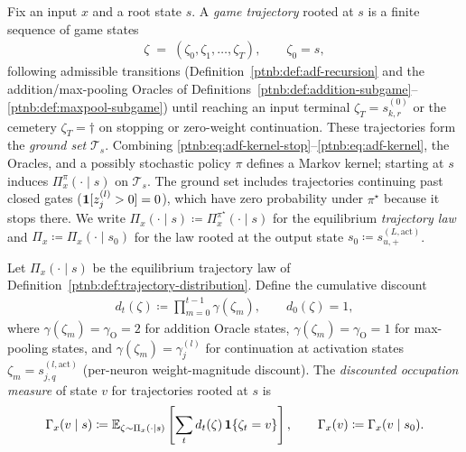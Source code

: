 \begin{definition}\label{ptnb:def:trajectory-distribution}
Fix an input $x$ and a root state $s$. A \emph{game trajectory} rooted at $s$ is a finite sequence
of game states
\begin{align}
    \zeta \;=\; (\zeta_0, \zeta_1, \dots, \zeta_T), \qquad \zeta_0 = s,
\end{align}
following admissible transitions (Definition~\ref{ptnb:def:adf-recursion} and the addition/max-pooling
Oracles of Definitions~\ref{ptnb:def:addition-subgame}--\ref{ptnb:def:maxpool-subgame}) until reaching
an input terminal $\zeta_T=s_{k,r}^{(0)}$ or the cemetery $\zeta_T=\dagger$ on stopping or zero-weight continuation.
These trajectories form the \emph{ground set} $\mathcal T_s$. Combining
\eqref{ptnb:eq:adf-kernel-stop}--\eqref{ptnb:eq:adf-kernel}, the Oracles, and a possibly stochastic
policy $\pi$ defines a Markov kernel; starting at $s$ induces $\Pi_x^\pi(\cdot\mid s)$ on
$\mathcal T_s$. The ground set includes trajectories continuing past closed gates
($\mathbf{1}[z_j^{(l)}>0]=0$), which have zero probability under $\pi^\star$ because it stops there. We write $\Pi_x(\cdot \mid s) \coloneqq
    \Pi_x^{\pi^\star}(\cdot \mid s)$ for the equilibrium \emph{trajectory law} and $\Pi_x \coloneqq
    \Pi_x(\cdot \mid s_0)$ for the law rooted at the output state $s_0 \coloneqq
    s_{u,+}^{(L,\mathrm{act})}$.
\end{definition}

\begin{definition}\label{ptnb:def:occupation}
Let $\Pi_x(\cdot \mid s)$ be the equilibrium trajectory law of
Definition~\ref{ptnb:def:trajectory-distribution}.
Define the cumulative discount
\begin{align}
    d_t(\zeta) \coloneqq \prod_{m=0}^{t-1} \gamma(\zeta_m), \qquad d_0(\zeta) = 1,
\end{align}
where $\gamma(\zeta_m) = \gamma_{\mathrm{O}} = 2$ for addition Oracle states, $\gamma(\zeta_m) =
    \gamma_{\mathrm{O}} = 1$ for max-pooling states, and $\gamma(\zeta_m) = \gamma_j^{(l)}$ for
continuation at activation states $\zeta_m = s_{j,q}^{(l,\mathrm{act})}$ (per-neuron
weight-magnitude discount). The \emph{discounted occupation measure} of state $v$ for trajectories
rooted at $s$ is
\begin{align}
    \Gamma_x(v \mid s) \coloneq \mathbb{E}_{\zeta \sim \Pi_x(\cdot \mid s)}\left[\sum_t d_t(\zeta)\,\mathbf{1}\{\zeta_t
    = v\}\right],
    \qquad
    \Gamma_x(v) \coloneqq \Gamma_x(v \mid s_0).
\end{align}
\end{definition}

